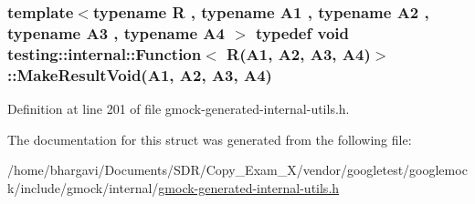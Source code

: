 \subsubsection[{\texorpdfstring{Make\+Result\+Void}{MakeResultVoid}}]{\setlength{\rightskip}{0pt plus 5cm}template$<$typename R , typename A1 , typename A2 , typename A3 , typename A4 $>$ typedef void {\bf testing\+::internal\+::\+Function}$<$ {\bf R}(A1, A2, A3, A4)$>$\+::Make\+Result\+Void(A1, A2, A3, A4)}\hypertarget{structtesting_1_1internal_1_1_function_3_01_r_07_a1_00_01_a2_00_01_a3_00_01_a4_08_4_af7462da27e87a9d580e7f9748ebc5754}{}\label{structtesting_1_1internal_1_1_function_3_01_r_07_a1_00_01_a2_00_01_a3_00_01_a4_08_4_af7462da27e87a9d580e7f9748ebc5754}


Definition at line 201 of file gmock-\/generated-\/internal-\/utils.\+h.



The documentation for this struct was generated from the following file\+:\begin{DoxyCompactItemize}
\item 
/home/bhargavi/\+Documents/\+S\+D\+R/\+Copy\+\_\+\+Exam\+\_\+X/vendor/googletest/googlemock/include/gmock/internal/\hyperlink{gmock-generated-internal-utils_8h}{gmock-\/generated-\/internal-\/utils.\+h}\end{DoxyCompactItemize}

